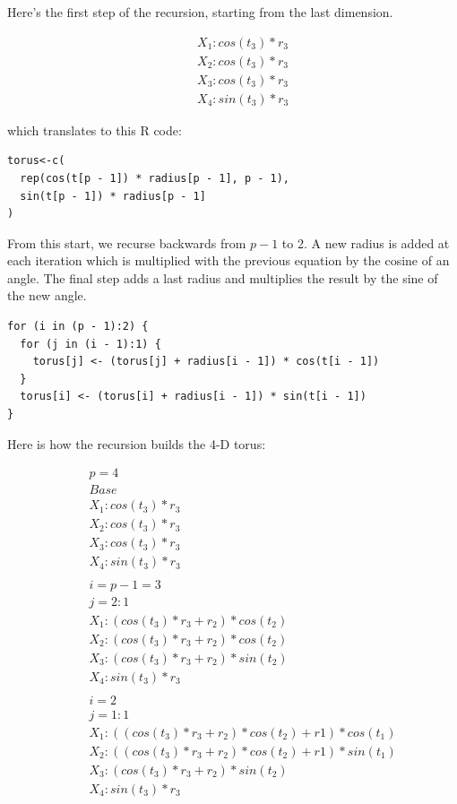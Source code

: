Here's the first step of the recursion, starting from the last
dimension.

\begin{eqnarray*}
&&X_1: cos(t_3) * r_3\\
&&X_2: cos(t_3) * r_3\\
&&X_3: cos(t_3) * r_3\\
&&X_4: sin(t_3) * r_3
\end{eqnarray*}

\noindent which translates to this R code:

\begin{verbatim}
torus<-c(
  rep(cos(t[p - 1]) * radius[p - 1], p - 1),
  sin(t[p - 1]) * radius[p - 1]
)
\end{verbatim}

From this start, we recurse backwards from $p-1$ to 2. A new radius is
added at each iteration which is multiplied with the previous equation
by the cosine of an angle. The final step adds a last radius and
multiplies the result by the sine of the new angle.

\begin{verbatim}
for (i in (p - 1):2) {
  for (j in (i - 1):1) {
    torus[j] <- (torus[j] + radius[i - 1]) * cos(t[i - 1])
  }
  torus[i] <- (torus[i] + radius[i - 1]) * sin(t[i - 1])
}
\end{verbatim}

Here is how the recursion builds the 4-D torus:

\begin{eqnarray*}
&&p=4\\
&&Base\\
&&X_1: cos(t_3) * r_3\\
&&X_2: cos(t_3) * r_3\\
&&X_3: cos(t_3) * r_3\\
&&X_4: sin(t_3) * r_3\\
\\
&&i=p-1=3\\
&&j=2:1\\
&&X_1: (cos(t_3) * r_3 + r_2) * cos(t_2)\\
&&X_2: (cos(t_3) * r_3 + r_2) * cos(t_2)\\
&&X_3: (cos(t_3) * r_3 + r_2) * sin(t_2)\\
&&X_4: sin(t_3) * r_3\\
\\
&&i=2\\
&&j=1:1\\
&&X_1: ((cos(t_3) * r_3 + r_2) * cos(t_2) + r1) * cos(t_1)\\
&&X_2: ((cos(t_3) * r_3 + r_2) * cos(t_2) + r1) * sin(t_1)\\
&&X_3: (cos(t_3) * r_3 + r_2) * sin(t_2)\\
&&X_4: sin(t_3) * r_3\\
\end{eqnarray*}


